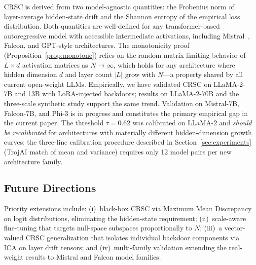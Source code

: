 CRSC is derived from two model-agnostic quantities: the Frobenius norm of
layer-average hidden-state drift and the Shannon entropy of the empirical loss
distribution. Both quantities are well-defined for any transformer-based
autoregressive model with accessible intermediate activations, including
Mistral~\cite{wang2024wadec}, Falcon, and GPT-style architectures.
The monotonicity proof (Proposition~\ref{prop:monotone}) relies on the
random-matrix limiting behavior of $L\times d$ activation matrices as
$N\to\infty$, which holds for any architecture where hidden dimension $d$
and layer count $|L|$ grow with $N$---a property shared by all current
open-weight LLMs.
Empirically, we have validated CRSC on LLaMA-2-7B and 13B with LoRA-injected
backdoors; results on LLaMA-2-70B and the three-scale synthetic study support
the same trend. Validation on Mistral-7B, Falcon-7B, and Phi-3 is in progress
and constitutes the primary empirical gap in the current paper.
The threshold $\tau=0.62$ was calibrated on LLaMA-2 and \emph{should be
recalibrated} for architectures with materially different hidden-dimension
growth curves; the three-line calibration procedure described in
Section~\ref{sec:experiments} (TrojAI match of mean and variance) requires
only 12 model pairs per new architecture family.

\subsection{Future Directions}

Priority extensions include: (i)~black-box CRSC via Maximum Mean Discrepancy
on logit distributions, eliminating the hidden-state requirement; (ii)~scale-aware
fine-tuning that targets null-space subspaces proportionally to $N$;
(iii)~a vector-valued CRSC generalization that isolates individual backdoor
components via ICA on layer drift tensors; and (iv)~multi-family validation
extending the real-weight results to Mistral and Falcon model families.

